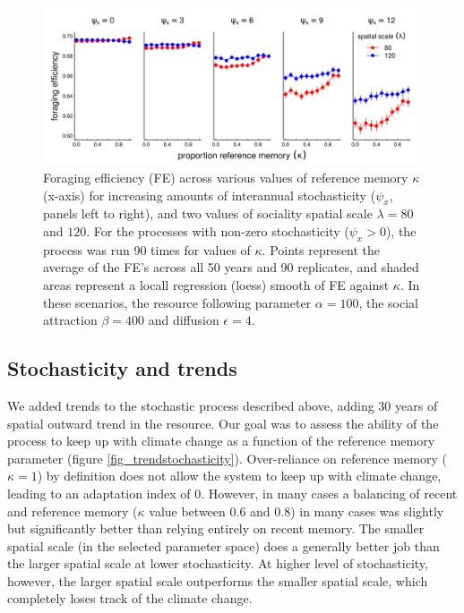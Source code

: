 \documentclass[utf8]{frontiersSCNS} %
\begin{document}
	\begin{figure}
		\includegraphics[width=\textwidth]{figures/stochasticity.png}
		
		\caption{\label{fig_stochasticity} Foraging efficiency (FE) across various values of reference memory $\kappa$ (x-axis) for increasing amounts of interannual stochasticity ($\psi_x$, panels left to right), and two values of sociality spatial scale $\lambda = 80$ and $120$. For the processes with non-zero stochasticity ($\psi_x > 0$), the process was run 90 times for values of $\kappa$. Points represent the average of the FE's across all 50 years and 90 replicates, and shaded areas represent a locall regression (loess) smooth of FE against $\kappa$. In these scenarios, the resource following parameter $\alpha = 100$, the social attraction $\beta = 400$ and diffusion $\epsilon = 4$.} 
		
	\end{figure}
	
	\subsection{Stochasticity and trends}
	
	We added trends to the stochastic process described above, adding 30 years of spatial outward trend in the resource. Our goal was to assess the ability of the process to keep up with climate change as a function of the reference memory parameter (figure \ref{fig_trendstochasticity}). Over-reliance on reference memory ($\kappa = 1$) by definition does not allow the system to keep up with climate change, leading to an adaptation index of 0. However, in many cases a balancing of recent and reference memory ($\kappa$ value between 0.6 and 0.8) in many cases was slightly but significantly better than relying entirely on recent memory. The smaller spatial scale (in the selected parameter space) does a generally better job than the larger spatial scale at lower stochasticity. At higher level of stochasticity, however, the larger spatial scale outperforms the smaller spatial scale, which completely loses track of the climate change.
	
\end{document}
